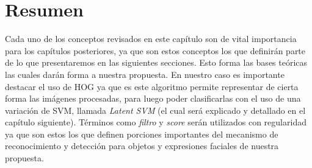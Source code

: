 \section{Resumen}\label{sec:resumen}

Cada uno de los conceptos revisados en este capítulo son de vital importancia para los capítulos posteriores, ya que son estos conceptos los que definirán parte de lo que presentaremos en las siguientes secciones. Esto forma las bases teóricas las cuales darán forma a nuestra propuesta. En nuestro caso es importante destacar el uso de HOG ya que es este algoritmo permite representar de cierta forma las imágenes procesadas, para luego poder clasificarlas con el uso de una variación de SVM, llamada \textit{Latent SVM} (el cual será explicado y detallado en el capítulo siguiente). Términos como \textit{filtro} y \textit{score} serán utilizados con regularidad ya que son estos los que definen porciones importantes del mecanismo de reconocimiento y detección para objetos y expresiones faciales de nuestra propuesta.


